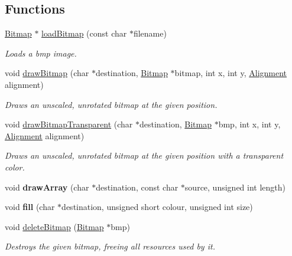 \subsection*{Functions}
\begin{DoxyCompactItemize}
\item 
\hyperlink{structBitmap}{Bitmap} $\ast$ \hyperlink{group__Bitmap_ga3506880ffd407c36eb8aaddd2c1606d2}{load\+Bitmap} (const char $\ast$filename)
\begin{DoxyCompactList}\small\item\em Loads a bmp image. \end{DoxyCompactList}\item 
void \hyperlink{group__Bitmap_ga7519704e8e57a10120d4b3a22b08e115}{draw\+Bitmap} (char $\ast$destination, \hyperlink{structBitmap}{Bitmap} $\ast$bitmap, int x, int y, \hyperlink{group__Bitmap_gacdfaca60ec19c0265bac2692d7982726}{Alignment} alignment)
\begin{DoxyCompactList}\small\item\em Draws an unscaled, unrotated bitmap at the given position. \end{DoxyCompactList}\item 
void \hyperlink{group__Bitmap_gaccd1dbc98892d1cc6bc4e87ede9a20a7}{draw\+Bitmap\+Transparent} (char $\ast$destination, \hyperlink{structBitmap}{Bitmap} $\ast$bmp, int x, int y, \hyperlink{group__Bitmap_gacdfaca60ec19c0265bac2692d7982726}{Alignment} alignment)
\begin{DoxyCompactList}\small\item\em Draws an unscaled, unrotated bitmap at the given position with a transparent color. \end{DoxyCompactList}\item 
void {\bfseries draw\+Array} (char $\ast$destination, const char $\ast$source, unsigned int length)\hypertarget{group__Bitmap_ga0d60fb66aa3c6461f53b2cde09940e13}{}\label{group__Bitmap_ga0d60fb66aa3c6461f53b2cde09940e13}

\item 
void {\bfseries fill} (char $\ast$destination, unsigned short colour, unsigned int size)\hypertarget{group__Bitmap_ga41dc43edb59791fc33f0b3d7256d1d08}{}\label{group__Bitmap_ga41dc43edb59791fc33f0b3d7256d1d08}

\item 
void \hyperlink{group__Bitmap_ga08c1d4f4fff81df260d979ea8fc1aa61}{delete\+Bitmap} (\hyperlink{structBitmap}{Bitmap} $\ast$bmp)
\begin{DoxyCompactList}\small\item\em Destroys the given bitmap, freeing all resources used by it. \end{DoxyCompactList}\end{DoxyCompactItemize}


